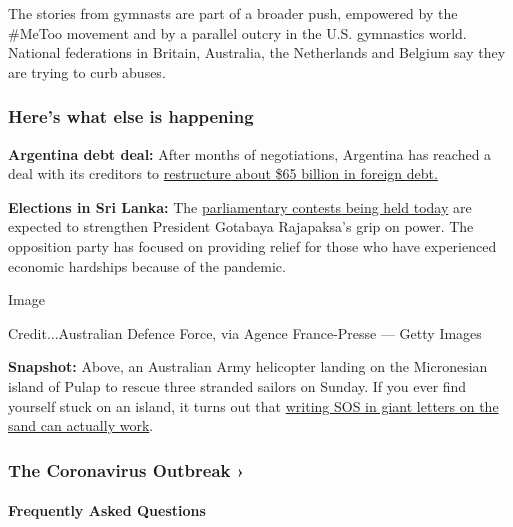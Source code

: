 The stories from gymnasts are part of a broader push, empowered by the
\#MeToo movement and by a parallel outcry in the U.S. gymnastics world.
National federations in Britain, Australia, the Netherlands and Belgium
say they are trying to curb abuses.

\hypertarget{heres-what-else-is-happening}{%
\subsubsection{Here's what else is
happening}\label{heres-what-else-is-happening}}

\textbf{Argentina debt deal:} After months of negotiations, Argentina
has reached a deal with its creditors to
\href{https://www.nytimes.com/live/2020/08/04/business/stock-market-today-coronavirus\#argentina-secures-a-deal-to-restructure-65-billion-in-debt}{restructure
about \$65 billion in foreign debt.}

\textbf{Elections in Sri Lanka:} The
\href{https://www.nytimes.com/aponline/2020/08/04/world/asia/ap-as-sri-lanka-election-glance.html}{parliamentary
contests being held today} are expected to strengthen President Gotabaya
Rajapaksa's grip on power. The opposition party has focused on providing
relief for those who have experienced economic hardships because of the
pandemic.

Image

Credit...Australian Defence Force, via Agence France-Presse --- Getty
Images

\textbf{Snapshot:} Above, an Australian Army helicopter landing on the
Micronesian island of Pulap to rescue three stranded sailors on Sunday.
If you ever find yourself stuck on an island, it turns out that
\href{https://www.nytimes.com/2020/08/04/world/australia/sos-pacific-island.html}{writing
SOS in giant letters on the sand can actually work}.

\href{https://www.nytimes.com/news-event/coronavirus?action=click\&pgtype=Article\&state=default\&region=MAIN_CONTENT_3\&context=storylines_faq}{}

\hypertarget{the-coronavirus-outbreak-}{%
\subsubsection{The Coronavirus Outbreak
›}\label{the-coronavirus-outbreak-}}

\hypertarget{frequently-asked-questions}{%
\paragraph{Frequently Asked
Questions}\label{frequently-asked-questions}}

